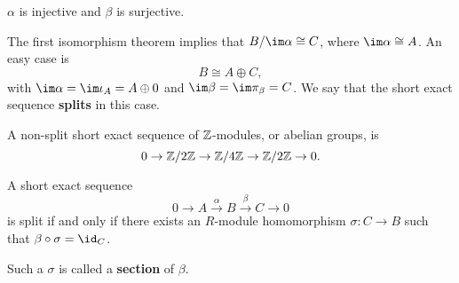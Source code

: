 \begin{note*}
$ \alpha $ is injective and $ \beta $ is surjective.
\end{note*}

\pagebreak

The first isomorphism theorem implies that $ B / \im \alpha \cong C $, where $ \im \alpha \cong A $. An easy case is
$$ B \cong A \oplus C, $$
with $ \im \alpha = \im \iota_A = A \oplus 0 $ and $ \im \beta = \im \pi_\beta = C $. We say that the short exact sequence \textbf{splits} in this case.

\begin{example*}
A non-split short exact sequence of $ \mathbb{Z} $-modules, or abelian groups, is
$$ 0 \to \mathbb{Z} / 2\mathbb{Z} \to \mathbb{Z} / 4\mathbb{Z} \to \mathbb{Z} / 2\mathbb{Z} \to 0. $$
\end{example*}

\begin{proposition}
A short exact sequence
$$ 0 \to A \xrightarrow{\alpha} B \xrightarrow{\beta} C \to 0 $$
is split if and only if there exists an $ R $-module homomorphism $ \sigma : C \to B $ such that $ \beta \circ \sigma = \id_C $.
\end{proposition}

Such a $ \sigma $ is called a \textbf{section} of $ \beta $.

